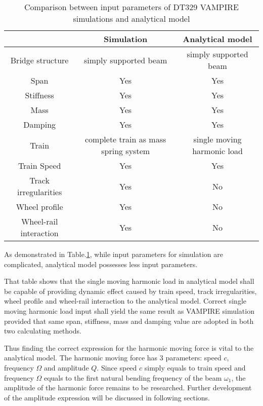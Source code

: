 \begin{table}[h!]
    \centering
    \caption{Comparison between input parameters of DT329 VAMPIRE simulations and analytical model}
    \begin{tabular}{c|cc}
        \hline
        & Simulation & Analytical model \\
        \hline
        Bridge structure & simply supported beam & simply supported beam \\
        Span & Yes & Yes \\
        Stiffness & Yes & Yes \\
        Mass & Yes & Yes \\
        Damping & Yes & Yes \\
        Train & complete train as mass spring system & single moving harmonic load \\
        Train Speed & Yes & Yes \\
        Track irregularities & Yes & No \\
        Wheel profile & Yes & No \\
        Wheel-rail interaction & Yes & No \\
        \hline
    \end{tabular}
    \label{tab:comparisonsimulationanalytical}
\end{table}

As demonstrated in Table.\ref{tab:comparisonsimulationanalytical}, while input parameters for simulation are complicated, analytical model possesses less input parameters. 

That table shows that the single moving harmonic load in analytical model shall be capable of providing dynamic effect caused by train speed, track irregularities, wheel profile and wheel-rail interaction to the analytical model. Correct single moving harmonic load input shall yield the same result as VAMPIRE simulation provided that same span, stiffness, mass and damping value are adopted in both two calculating methods.

Thus finding the correct expression for the harmonic moving force is vital to the analytical model. The harmonic moving force has 3 parameters: speed $c$, frequency $\Omega$  and amplitude $Q$. Since speed $c$ simply equals to train speed and frequency $\Omega$ equals to the first natural bending frequency of the beam $\omega_1$, the amplitude of the harmonic force remains to be researched. Further development of the amplitude expression will be discussed in following sections.



